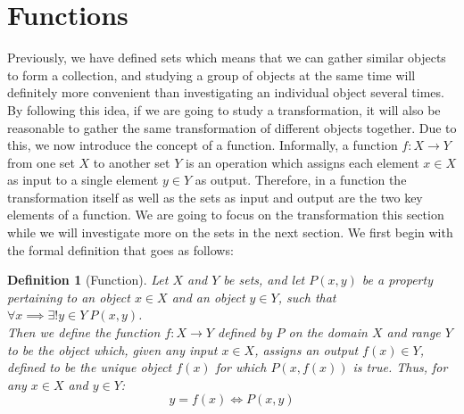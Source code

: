 \documentclass[a4paper]{book}
\theoremstyle{break}
\newtheorem{definition}{Definition}[section]
\begin{document}
		\section{Functions}
			Previously, we have defined sets which means that we can gather similar objects to form a collection, and studying a group of objects at the same time will definitely more convenient than investigating an individual object several times. By following this idea, if we are going to study a transformation, it will also be reasonable to gather the same transformation of different objects together. Due to this, we now introduce the concept of a function. Informally, a function $f:X\to Y$ from one set $X$ to another set $Y$ is an operation which assigns each element $x\in X$ as input to a single element $y\in Y$ as output. Therefore, in a function the transformation itself as well as the sets as input and output are the two key elements of a function. We are going to focus on the transformation this section while we will investigate more on the sets in the next section. We first begin with the formal definition that goes as follows:
			\begin{definition}[Function]
				Let $X$ and $Y$ be sets, and let $P(x,y)$ be a property pertaining to an object $x\in X$ and an object $y\in Y$, such that $\forall x\implies\exists!y\in Y~P(x,y)$.\\
				Then we define the function $f:X\to Y$ defined by $P$ on the domain $X$ and range $Y$ to be the object which, given any input $x\in X$, assigns an output $f(x)\in Y$, defined to be the unique object $f(x)$ for which $P(x,f(x))$ is true. Thus, for any $x\in X$ and $y\in Y$:
				$$y=f(x)\iff P(x,y)$$
			\end{definition}
\end{document}
